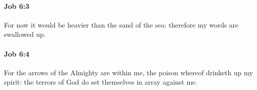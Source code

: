 		\paragraph{Job 6:3} %
			\label{JOB-6-3}

			For now it would be heavier than the sand of the sea: therefore my words are swallowed up.


		\paragraph{Job 6:4} %
			\label{JOB-6-4}

			For the arrows of the Almighty are within me, the poison whereof drinketh up my spirit: the terrors of God do set themselves in array against me.


